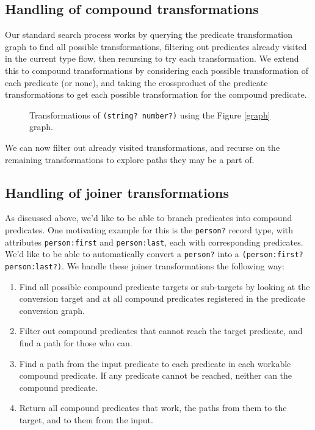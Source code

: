 \documentclass[letterpaper]{article}
\begin{document}
\subsection{Handling of compound transformations}

Our standard search process works by querying the predicate transformation graph to find all possible transformations, filtering out predicates already visited in the current type flow, then recursing to try each transformation.  We extend this to compound transformations by considering each possible transformation of each predicate (or none), and taking the crossproduct of the predicate transformations to get each possible transformation for the compound predicate.

\begin{figure}[h!]
\centering

\caption{Transformations of \texttt{(string? number?)} using the Figure \ref{graph} graph.}
\label{crossproduct}
\end{figure}

We can now filter out already visited transformations, and recurse on the remaining transformations to explore paths they may be a part of.

\subsection{Handling of joiner transformations}

As discussed above, we'd like to be able to branch predicates into compound predicates.  One motivating example for this is the \texttt{person?} record type, with attributes \texttt{person:first} and \texttt{person:last}, each with corresponding predicates.  We'd like to be able to automatically convert a \texttt{person?} into a \texttt{(person:first? person:last?)}.  We handle these joiner transformations the following way:

\begin{enumerate}
  \item Find all possible compound predicate targets or sub-targets by looking at the conversion target and at all compound predicates registered in the predicate conversion graph.
  \item Filter out compound predicates that cannot reach the target predicate, and find a path for those who can.
  \item Find a path from the input predicate to each predicate in each workable compound predicate.  If any predicate cannot be reached, neither can the compound predicate.
  \item Return all compound predicates that work, the paths from them to the target, and to them from the input.
\end{enumerate}
\end{document}

